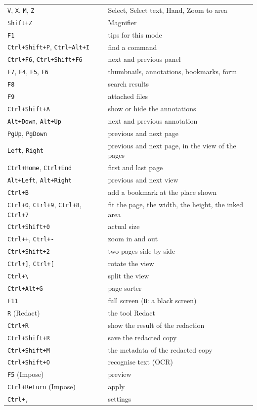 \documentclass[12pt,
              article,
              oneside
              ]{memoir}
\newcommand*{\key}[1]{\texttt{#1}}
\begin{document}
\begin{longtable}{@{}>{\raggedright}p{}p{}@{}}
\key{V}, \key{X}, \key{M}, \key{Z} & Select, Select text, Hand, Zoom to area\\
\key{Shift+Z} & Magnifier\\
\key{F1} & tips for this mode\\
\key{Ctrl+Shift+P}, \key{Ctrl+Alt+I} & find a command\\
\key{Ctrl+F6}, \key{Ctrl+Shift+F6} & next and previous panel\\
\key{F7}, \key{F4}, \key{F5}, \key{F6} & thumbnails, annotations, bookmarks, form\\
\key{F8} & search results\\
\key{F9} & attached files\\
\key{Ctrl+Shift+A} & show or hide the annotations\\
\key{Alt+Down}, \key{Alt+Up} & next and previous annotation\\
\key{PgUp}, \key{PgDown} & previous and next page\\
\key{Left}, \key{Right} & previous and next page, in the view of the pages\\
\key{Ctrl+Home}, \key{Ctrl+End} & first and last page\\
\key{Alt+Left}, \key{Alt+Right} & previous and next view\\
\key{Ctrl+B} & add a bookmark at the place shown\\
\key{Ctrl+0}, \key{Ctrl+9}, \key{Ctrl+8}, \key{Ctrl+7} & fit the page, the width, the height, the inked area\\
\key{Ctrl+Shift+0} & actual size\\
\key{Ctrl++}, \key{Ctrl+-} & zoom in and out\\
\key{Ctrl+Shift+2} & two pages side by side\\
\key{Ctrl+]}, \key{Ctrl+[} & rotate the view\\
\key{Ctrl+\textbackslash} & split the view\\
\key{Ctrl+Alt+G} & page sorter\\
\key{F11} & full screen (\key{B}: a black screen)\\
\key{R} (Redact) & the tool Redact\\
\key{Ctrl+R} & show the result of the redaction\\
\key{Ctrl+Shift+R} & save the redacted copy\\
\key{Ctrl+Shift+M} & the metadata of the redacted copy\\
\key{Ctrl+Shift+O} & recognise text (OCR)\\
\key{F5} (Impose) & preview\\
\key{Ctrl+Return} (Impose) & apply\\
\key{Ctrl+,} & settings\\
\bottomrule
\end{longtable}
\end{document}

